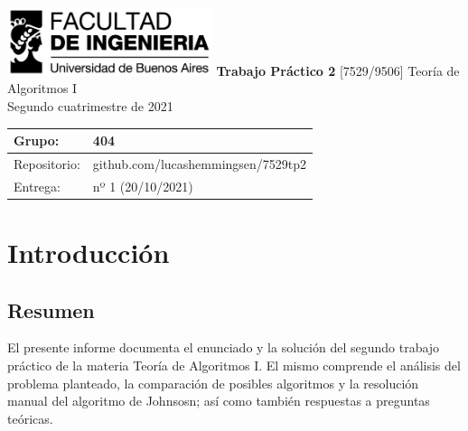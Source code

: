 \documentclass[titlepage,a4paper]{article}
\begin{document}
\begin{titlepage} %
	\hfill\includegraphics[width=6cm]{img/logofiuba.jpg}
    \centering
    \vfill
    \Huge \textbf{Trabajo Práctico 2}
    \vskip2cm
    \Large [7529/9506] Teoría de Algoritmos I\\
    Segundo cuatrimestre de 2021
    \vfill
    \begin{tabular}{ | l | l | } %
      \hline
      Grupo: & 404 \\ \hline
      Repositorio: & github.com/lucashemmingsen/7529tp2 \\ \hline
      Entrega: & nº 1 (20/10/2021) \\ \hline
  	\end{tabular}
    \vfill
    
    \vfill
\end{titlepage}

\tableofcontents %
\newpage

\renewcommand{\thesection}{\Alph{section}}%
\setcounter{section}{8} %

\section{Introducción}\label{sec:intro}
\subsection{Resumen}
El presente informe documenta el enunciado y la solución del segundo trabajo práctico
de la materia Teoría de Algoritmos I. El mismo comprende el análisis del problema
planteado, la comparación de posibles algoritmos y la resolución manual del algoritmo
de Johnsosn; así como también respuestas a preguntas teóricas.
\end{document}
